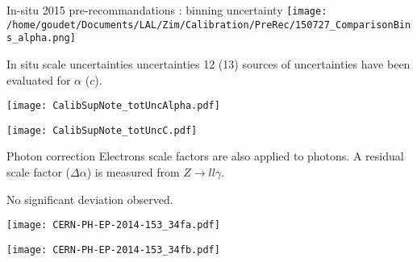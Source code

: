 \begin{frame}{In-situ 2015 pre-recommandations : binning uncertainty}
  \centering
  \texttt{[image: /home/goudet/Documents/LAL/Zim/Calibration/PreRec/150727\_ComparisonBins\_alpha.png]}
  \end{frame}
\begin{frame}{In situ scale uncertainties uncertainties}
  12 (13) sources of uncertainties have been evaluated for $\alpha$ ($c$).

    \begin{minipage}{0.49\linewidth} 
      \texttt{[image: CalibSupNote\_totUncAlpha.pdf]}
  \end{minipage}
  \hfill
  \begin{minipage}{0.49\linewidth}
    \texttt{[image: CalibSupNote\_totUncC.pdf]}
  \end{minipage}

\end{frame}

\begin{frame}{Photon correction}
Electrons scale factors are also applied to photons. 
A residual scale factor ($\Delta\alpha$) is measured from $Z\rightarrow ll\gamma$.

No significant deviation observed.
\newline
  \begin{minipage}{0.49\linewidth}
    \texttt{[image: CERN-PH-EP-2014-153\_34fa.pdf]}
  \end{minipage}
  \hfill
  \begin{minipage}{0.49\linewidth}
    \texttt{[image: CERN-PH-EP-2014-153\_34fb.pdf]}
  \end{minipage}
\end{frame}

